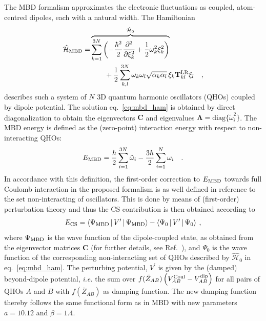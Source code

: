 \documentclass[aps,prl,groupaddress, twocolumn]{revtex4-1}
\begin{document}
The MBD formalism approximates the electronic fluctuations as coupled, atom-centred dipoles, each with a natural width. The Hamiltonian
\begin{equation}\label{eq:mbd_ham}
\begin{split}
\hat{\mathcal{H}}_{\mathrm{MBD}} = &\overbrace{ \sum_{k=1}^{3N} \left( -\frac{\hbar^2}{2}\frac{\partial^2}{\partial \xi_{k}^2} + \frac{1}{2}\omega_k^2  \xi_k^2\right) }^{\hat{\mathcal{H}}_0}\\
& \qquad + \frac{1}{2}\sum_{k,l}^{3N} \omega_k\omega_l\sqrt{\alpha_k \alpha_l}\,\xi_k \mathbf{T}_{kl}^{\rm LR} \xi_l \quad,
\end{split}
\end{equation}
describes such a system of $N$ 3D quantum harmonic oscillators (QHOs) coupled by dipole potential. The solution eq.~\eqref{eq:mbd_ham} is obtained by direct diagonalization to obtain the eigenvectors $\mathbf{C}$ and eigenvalues $\mathbf{\Lambda} = \mathrm{diag}\{\tilde{\omega}_i^2\}$. The MBD energy is defined as the (zero-point) interaction energy with respect to non-interacting QHOs:
 \begin{eqnarray}
 E_{\rm MBD}
=\frac{\hbar}{2}\sum_{i=1}^{3N}\tilde{\omega}_i - \frac{3\hbar}{2}\sum_{i=1}^{N}\omega_i \quad . \label{eq:mbd_en}
 \end{eqnarray}
 In accordance with this definition, the first-order correction to $E_{\rm MBD}$ towards full Coulomb interaction in the proposed formalism is as well defined in reference to the set non-interacting of oscillators. This is done by means of (first-order) perturbation theory and thus the CS contribution is then obtained according to
 \begin{equation}\label{foc_energy_damp}
E_{\rm CS} = \Braket{\Psi_{\rm MBD} | V^\prime | \Psi_{\rm MBD}} - \Braket{\Psi_0 | V^\prime | \Psi_0} \:,
\end{equation}
where $\Psi_{\rm MBD}$ is the wave function of the dipole-coupled state, as obtained from the eigenvector matrices $\mathbf{C}$ (for further details, see Ref.~\cite{hermann_ncomm2017}), and $\Psi_0$ is the wave function of the corresponding non-interacting set of QHOs described by $\hat{\mathcal{H}}_0$ in eq.~\eqref{eq:mbd_ham}. The perturbing potential, $V^\prime$ is given by the (damped) beyond-dipole potential, \textit{i.e.} the sum over $f(\bar{Z}_{AB})\left(V_{AB}^{\rm Coul}-V_{AB}^{\rm dip}\right)$ for all pairs of QHOs $A$ and $B$ with $f(\bar{Z}_{AB})$ as damping function. The new damping function thereby follows the same functional form as in MBD with new parameters $a=10.12$ and $\beta=1.4$.
\end{document}
